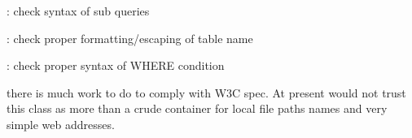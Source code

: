 \begin{DoxyRefList}
\+: check syntax of sub queries  
\item[\label{todo__todo000014}%
\hypertarget{todo__todo000014}{}%
Global \hyperlink{class_able_polecat___service___dtx_abstract_aca5a5c1f3b4b4d4b90d46796d98510db}{Able\+Polecat\+\_\+\+Service\+\_\+\+Dtx\+Abstract\+:\+:set\+Table\+Name} (\$table\+\_\+name)]\+: check proper formatting/escaping of table name  
\item[\label{todo__todo000016}%
\hypertarget{todo__todo000016}{}%
Global \hyperlink{class_able_polecat___service___dtx_abstract_ab41e2a612cda6276d37ad1afd264e3df}{Able\+Polecat\+\_\+\+Service\+\_\+\+Dtx\+Abstract\+:\+:set\+Where\+Condition} (\$where\+\_\+condition)]\+: check proper syntax of W\+H\+E\+R\+E condition  
\item[\label{todo__todo000001}%
\hypertarget{todo__todo000001}{}%
File \hyperlink{_locater_8php}{Locater.php} ]there is much work to do to comply with W3\+C spec. At present would not trust this class as more than a crude container for local file paths names and very simple web addresses.
\end{DoxyRefList}